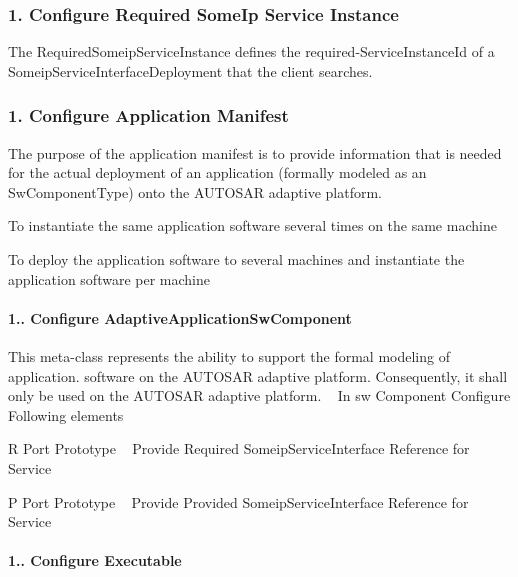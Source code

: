  \subsubsection*{1. Configure Required Some\+Ip Service Instance}

The Required\+Someip\+Service\+Instance defines the required-\/\+Service\+Instance\+Id of a Someip\+Service\+Interface\+Deployment that the client searches.

 \subsubsection*{1. Configure Application Manifest}

The purpose of the application manifest is to provide information that is needed for the actual deployment of an application (formally modeled as an Sw\+Component\+Type) onto the A\+U\+T\+O\+S\+AR adaptive platform.
\begin{DoxyItemize}
\item To instantiate the same application software several times on the same machine
\item To deploy the application software to several machines and instantiate the application software per machine
\end{DoxyItemize}

\paragraph*{1.. Configure Adaptive\+Application\+Sw\+Component}

This meta-\/class represents the ability to support the formal modeling of application. software on the A\+U\+T\+O\+S\+AR adaptive platform. Consequently, it shall only be used on the A\+U\+T\+O\+S\+AR adaptive platform. ~\newline
 In sw Component Configure Following elements ~\newline

\begin{DoxyItemize}
\item R Port Prototype ~\newline
 Provide Required Someip\+Service\+Interface Reference for Service
\item P Port Prototype ~\newline
 Provide Provided Someip\+Service\+Interface Reference for Service
\end{DoxyItemize}

 \paragraph*{1.. Configure Executable}

